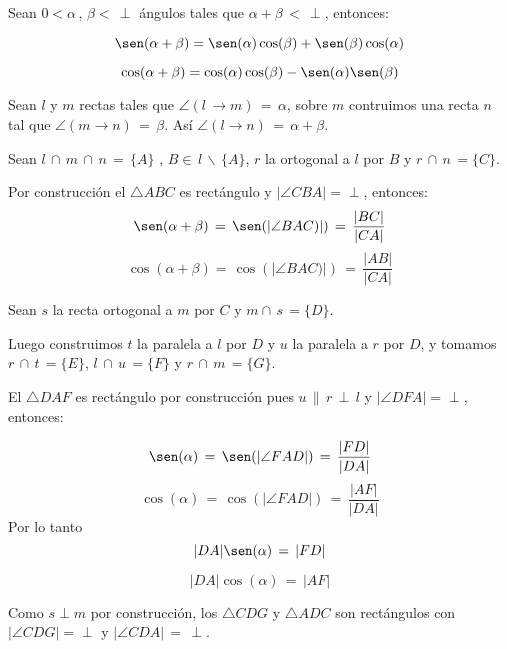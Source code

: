 \begin{prop}\label{sumsen}
Sean $0 < \alpha\, , \,\beta <\, \perp$ ángulos tales que $\alpha + \beta\, < \,\perp$, entonces:
     
     \[ \sen(\alpha + \beta) = \sen(\alpha)\cos(\beta) + \sen(\beta)\cos(\alpha) \]

     \[ \cos(\alpha + \beta) = \cos(\alpha)\cos(\beta) - \sen(\alpha)\sen(\beta) \]
\end{prop}     
\begin{pba}
Sean $l$ y $m$ rectas tales que $\angle (l\,\longrightarrow m)\,=\,\alpha$,
sobre $m$ contruimos una recta $n$ tal que $\angle ( m \longrightarrow n)\,=\,\beta$.  Así $\angle (l \longrightarrow n) \,=\, \alpha + \beta$.

Sean $l\,\cap\,m\,\cap\,n \,=\,\{ A \}$ ,  $B\in\,l\,\backslash\, \{A\}$,
$r$ la ortogonal a $l$ por $B$ y $r\,\cap\,n\,=\{C\}$.

Por construcción el  $\triangle ABC$ es rectángulo y $|\angle CBA |=\perp$, entonces:
\begin{equation}\label{sumsen1}
\sen(\alpha+\beta)\,=\,\sen(|\angle BAC)|)\,=\,\frac{|BC|}{|CA|}
\end{equation}
\begin{equation}\label{sumcos1}
\cos(\alpha + \beta) =\,\cos(|\angle BAC)|)\,=\, \frac{|AB|}{|CA|}
\end{equation}
     
Sean $s$ la recta ortogonal a $m$ por $C$ y $m\cap\,s\,=\{D\}$.

Luego construimos $t$ la paralela a $l$ por $D$ y $u$ la paralela a $r$ por $D$, y tomamos $r\,\cap\,t\,= \{ E\}$, $l\,\cap\,u\,= \{ F\}$ y $r\,\cap\,m\,= \{G\}$.

El $\triangle DAF$ es rectángulo por construcción pues $u\,\parallel\,r\,\perp\, l$ y $|\angle DFA|=\perp$, entonces:

\[\sen(\alpha)\,=\,\sen(|\angle FAD|)\,=\,\frac{|FD|}{|DA|}\]
\[\cos(\alpha)\,=\,\cos(|\angle FAD|)\,=\,\frac{|AF|}{|DA|}\]
Por lo tanto  \begin{equation}\label{sumsen2}
|DA|\sen(\alpha)\,=\,|FD|
\end{equation}
              
\begin{equation}\label{sumcos2}
|DA|\cos(\alpha)\,=\,|AF|
\end{equation}

Como $s \perp m$ por construcción, los  $\triangle CDG$  y $\triangle ADC$ son rectángulos con $|\angle CDG|=\perp$ y $|\angle CDA|\,=\,\perp$.
\\


\end{pba}

